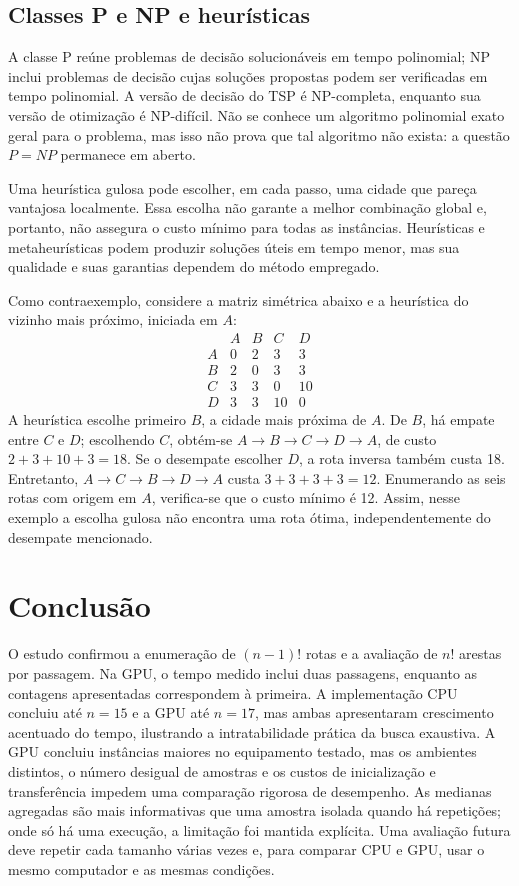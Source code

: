 \documentclass[12pt,a4paper]{article}
\begin{document}
\subsection{Classes P e NP e heurísticas}

A classe P reúne problemas de decisão solucionáveis em tempo polinomial; NP inclui problemas de decisão cujas soluções propostas podem ser verificadas em tempo polinomial. A versão de decisão do TSP é NP-completa, enquanto sua versão de otimização é NP-difícil. Não se conhece um algoritmo polinomial exato geral para o problema, mas isso não prova que tal algoritmo não exista: a questão $P=NP$ permanece em aberto.

Uma heurística gulosa pode escolher, em cada passo, uma cidade que pareça vantajosa localmente. Essa escolha não garante a melhor combinação global e, portanto, não assegura o custo mínimo para todas as instâncias. Heurísticas e metaheurísticas podem produzir soluções úteis em tempo menor, mas sua qualidade e suas garantias dependem do método empregado.

Como contraexemplo, considere a matriz simétrica abaixo e a heurística do vizinho mais próximo, iniciada em $A$:
\[
\begin{array}{c|rrrr}
 & A & B & C & D\\ \hline
A & 0 & 2 & 3 & 3\\
B & 2 & 0 & 3 & 3\\
C & 3 & 3 & 0 & 10\\
D & 3 & 3 & 10 & 0
\end{array}
\]
A heurística escolhe primeiro $B$, a cidade mais próxima de $A$. De $B$, há empate entre $C$ e $D$; escolhendo $C$, obtém-se $A\to B\to C\to D\to A$, de custo $2+3+10+3=18$. Se o desempate escolher $D$, a rota inversa também custa 18. Entretanto, $A\to C\to B\to D\to A$ custa $3+3+3+3=12$. Enumerando as seis rotas com origem em $A$, verifica-se que o custo mínimo é 12. Assim, nesse exemplo a escolha gulosa não encontra uma rota ótima, independentemente do desempate mencionado.

\section{Conclusão}

O estudo confirmou a enumeração de $(n-1)!$ rotas e a avaliação de $n!$ arestas por passagem. Na GPU, o tempo medido inclui duas passagens, enquanto as contagens apresentadas correspondem à primeira. A implementação CPU concluiu até $n=15$ e a GPU até $n=17$, mas ambas apresentaram crescimento acentuado do tempo, ilustrando a intratabilidade prática da busca exaustiva. A GPU concluiu instâncias maiores no equipamento testado, mas os ambientes distintos, o número desigual de amostras e os custos de inicialização e transferência impedem uma comparação rigorosa de desempenho. As medianas agregadas são mais informativas que uma amostra isolada quando há repetições; onde só há uma execução, a limitação foi mantida explícita. Uma avaliação futura deve repetir cada tamanho várias vezes e, para comparar CPU e GPU, usar o mesmo computador e as mesmas condições.
\end{document}
